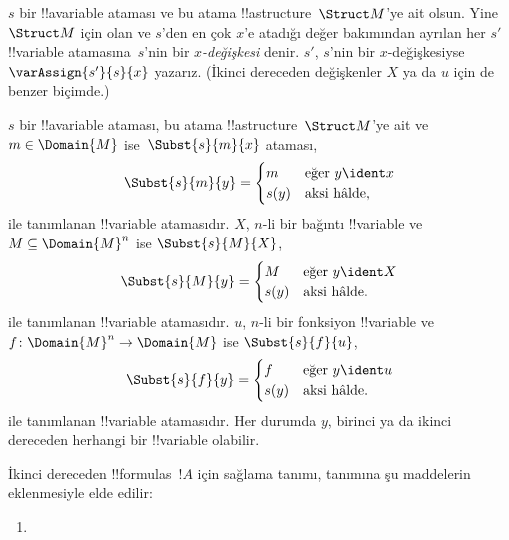 \documentclass[../../../include/open-logic-section]{subfiles}
\begin{document}
\begin{defn}[$x$-değişkesi]
$s$ bir !!a{variable} ataması ve bu atama !!a{structure}~$\Struct M$'ye ait olsun.
Yine~$\Struct M$ için olan ve $s$'den en çok $x$'e atadığı değer bakımından
ayrılan her $s'$ !!{variable}
atamasına~$s$'nin bir \emph{$x$-değişkesi} denir. $s'$, $s$'nin
bir $x$-değişkesiyse $\varAssign{s'}{s}{x}$ yazarız. (İkinci dereceden
değişkenler $X$ ya da $u$ için de benzer biçimde.)
\end{defn}

\begin{defn}
  $s$ bir !!a{variable} ataması, bu atama !!a{structure}~$\Struct M$'ye ait ve
  $m \in \Domain{M}$ ise~$\Subst{s}{m}{x}$ ataması,
  \[\Subst{s}{m}{y} = \begin{cases}
    m & \text{eğer } y \ident x\\
    s(y) & \text{aksi hâlde},
  \end{cases}\]
  ile tanımlanan !!{variable} atamasıdır.
  $X$, $n$-li bir bağıntı !!{variable} ve $M \subseteq \Domain{M}^n$ ise
  $\Subst{s}{M}{X}$,
  \[\Subst{s}{M}{y} = \begin{cases}
    M & \text{eğer } y \ident X\\
    s(y) & \text{aksi hâlde}.
  \end{cases}\]
  ile tanımlanan !!{variable} atamasıdır.
  $u$, $n$-li bir fonksiyon !!{variable} ve
  $f\colon \Domain{M}^n \to \Domain{M}$ ise $\Subst{s}{f}{u}$,
  \[\Subst{s}{f}{y} = \begin{cases}
    f & \text{eğer } y \ident u\\
    s(y) & \text{aksi hâlde}.
  \end{cases}\]
  ile tanımlanan !!{variable} atamasıdır. Her durumda $y$, birinci
  ya da ikinci dereceden herhangi bir !!{variable} olabilir.
\end{defn}

\begin{defn}[Sağlama]
İkinci dereceden !!{formula}s~$!A$ için sağlama tanımı,
 tanımına şu maddelerin eklenmesiyle
elde edilir:
\begin{enumerate}
\item {}



\end{enumerate}
\end{defn}
\end{document}
